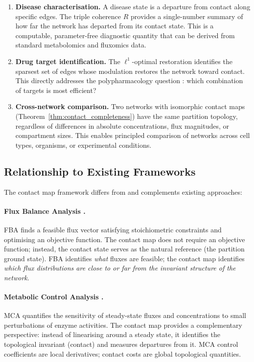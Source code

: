 \documentclass[11pt,twocolumn]{article}
\theoremstyle{plain}
\theoremstyle{definition}
\begin{document}
\begin{enumerate}[label=(\roman*)]
\item \textbf{Disease characterisation.} A disease state is a departure from
  contact along specific edges. The triple coherence $R$ provides a
  single-number summary of how far the network has departed from its contact
  state. This is a computable, parameter-free diagnostic quantity that can be
  derived from standard metabolomics and fluxomics data.

\item \textbf{Drug target identification.} The $\ell^1$-optimal restoration
  identifies the sparsest set of edges whose modulation restores the network
  toward contact. This directly addresses the polypharmacology question
  \cite{hopkins2008network}: which combination of targets is most efficient?

\item \textbf{Cross-network comparison.} Two networks with isomorphic contact
  maps (Theorem~\ref{thm:contact_completeness}) have the same partition
  topology, regardless of differences in absolute concentrations, flux
  magnitudes, or compartment sizes. This enables principled comparison of
  networks across cell types, organisms, or experimental conditions.
\end{enumerate}

\subsection{Relationship to Existing Frameworks}

The contact map framework differs from and complements existing approaches:

\paragraph{Flux Balance Analysis \cite{orth2010flux}.}
FBA finds a feasible flux vector satisfying stoichiometric constraints and
optimising an objective function. The contact map does not require an objective
function; instead, the contact state serves as the natural reference (the
partition ground state). FBA identifies \emph{what} fluxes are feasible; the
contact map identifies \emph{which flux distributions are close to or far from
the invariant structure of the network}.

\paragraph{Metabolic Control Analysis \cite{kacser1973control, fell1992metabolic,
heinrich1974linear}.}
MCA quantifies the sensitivity of steady-state fluxes and concentrations to
small perturbations of enzyme activities. The contact map provides a
complementary perspective: instead of linearising around a steady state, it
identifies the topological invariant (contact) and measures departures from it.
MCA control coefficients are local derivatives; contact costs are global
topological quantities.
\end{document}
